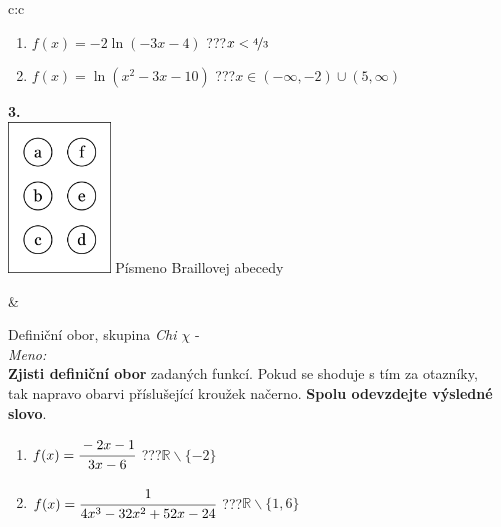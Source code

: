 \documentclass[10pt]{report}
\begin{document}
\begin{tabular}{c:c}
\begin{minipage}[c][99mm][t]{0.49\linewidth}
\begin{center}
\begin{minipage}{0.77\linewidth}
\begin{center}
\begin{varwidth}{\textwidth}
\begin{enumerate}
\item $f(x)=-2\ln{(-3x-4)}$\quad \dotfill\; ???\;\dotfill \quad $x<\nicefrac{4}{3}$
\item $f(x)=\ln{(x^2-3x-10)}$\quad \dotfill\; ???\;\dotfill \quad $x\in(-\infty , -2)\cup(5 , \infty)$
\end{enumerate}
\end{varwidth}
\end{center}
\end{minipage}
\begin{minipage}{0.20\linewidth}
\begin{center}
{\Huge\bfseries 3.} \\[2mm]
\includegraphics[height=40mm]{../images/braille.png}
{\small Písmeno Braillovej abecedy}
\end{center}
\end{minipage}
\end{center}
\end{minipage}
&
\begin{minipage}[c][99mm][t]{0.49\linewidth}
\begin{center}
\vspace{7mm}
{\huge Definiční obor, skupina \textit{Chi $\chi$} -}\\[4.5mm]
\textit{Meno:}\phantom{xxxxxxxxxxxxxxxxxxxxxxxxxxxxxxxxxxxxxxxxxxxxxxxxxxxxxxxxxxxxxxxxx}\\[3.5mm]
\textbf{Zjisti definiční obor} zadaných funkcí. Pokud se shoduje s tím za otazníky,\\tak napravo obarvi příslušející kroužek načerno. \textbf{Spolu odevzdejte výsledné slovo}.\\[3mm]
\begin{minipage}{0.77\linewidth}
\begin{center}
\begin{varwidth}{\textwidth}
\begin{enumerate}
\normalsize
\item $f(x)=\cfrac{-2x-1}{3x-6}$\quad \dotfill\; ???\;\dotfill \quad $\mathbb{R}\smallsetminus\{-2\}$
\item $f(x)=\cfrac{1}{4x^3-32x^2+52x-24}$\quad \dotfill\; ???\;\dotfill \quad $\mathbb{R}\smallsetminus\{1,6\}$

\end{enumerate}
\end{varwidth}
\end{center}
\end{minipage}
\end{center}
\end{minipage}
\end{tabular}
\end{document}
